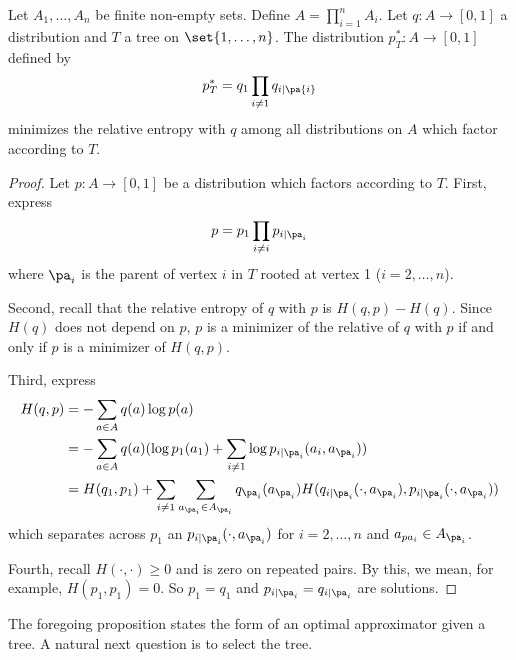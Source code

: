 \begin{proposition}

\label{prop:treeapproximators}Let $A_1, \dots  , A_n$ be finite non-empty sets.
Define $A = \prod_{i = 1}^{n} A_i$.
Let $q: A \to [0, 1]$ a distribution and $T$ a tree on $\set{1, \dots  , n}$.
The distribution $p^*_T: A \to [0, 1]$ defined by
\[
p^*_T = q_1 \prod_{i \neq 1} q_{i \mid \pa{i}}
\]
minimizes the relative entropy with $q$ among all distributions on $A$ which factor according to $T$.

\begin{proof}Let $p: A \to [0, 1]$ be a distribution which factors according to $T$.
First, express
\[
p = p_1 \prod_{i \neq i} p_{i \mid \pa_i}
\]
where $\pa_i$ is the parent of vertex $i$ in $T$ rooted at vertex 1 ($i = 2, \dots  , n$).

Second, recall that the relative entropy of $q$ with $p$ is $H(q, p) - H(q)$.
Since $H(q)$ does not depend on $p$, $p$ is a minimizer of the relative of $q$ with $p$ if and only if $p$ is a minimizer of $H(q, p)$.

Third, express
\[
\begin{aligned}
H(q, p) &= - \sum_{a \in A} q(a) \log p(a) \\
&= - \sum_{a \in A} q(a) (\log p_1(a_1) + \sum_{i \neq 1} \log p_{i \mid \pa_i}(a_i, a_{\pa_i})) \\
&= H(q_1, p_1) + \sum_{i \neq 1} \sum_{a_{\pa_i} \in A_{\pa_i}} q_{\pa_i}(a_{\pa_i})H(q_{i\mid\pa_i}(\cdot , a_{\pa_i}), p_{i\mid\pa_i}(\cdot , a_{\pa_i}))
\end{aligned}
\]
which separates across $p_1$ an $p_{i \mid \pa_i}(\cdot , a_{\pa_i})$ for $i = 2, \dots  , n$ and $a_{pa_i} \in A_{\pa_i}$.

Fourth, recall $H(\cdot , \cdot ) \geq 0$ and is zero on repeated pairs.
By this, we mean, for example, $H(p_1, p_1) = 0$.
So $p_1 = q_1$ and $p_{i \mid \pa_i} = q_{i \mid \pa_i}$ are solutions.
\end{proof}
\end{proposition}

The foregoing proposition states the form of an optimal approximator given a tree.
A natural next question is to select the tree.
